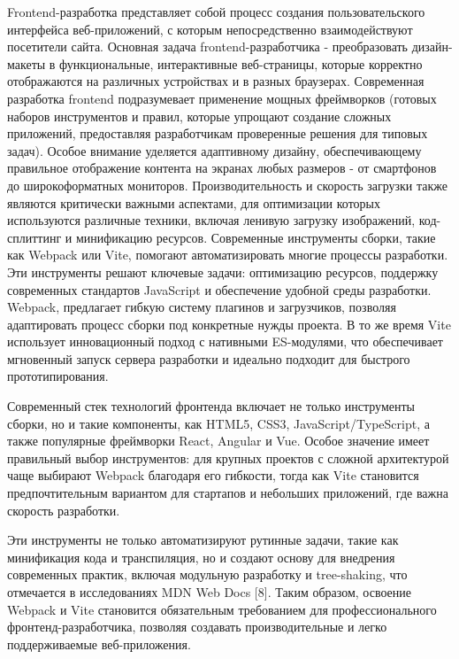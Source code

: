\documentclass[referat]{SCWorks}
\begin{document}
Frontend-разработка представляет собой процесс создания пользовательского интерфейса веб-приложений, с которым непосредственно взаимодействуют посетители сайта. Основная задача frontend-разработчика - преобразовать дизайн-макеты в функциональные, интерактивные веб-страницы, которые корректно отображаются на различных устройствах и в разных браузерах. Современная разработка frontend подразумевает применение мощных фреймворков (готовых наборов инструментов и правил, которые упрощают создание сложных приложений, предоставляя разработчикам проверенные решения для типовых задач). Особое внимание уделяется адаптивному дизайну, обеспечивающему правильное отображение контента на экранах любых размеров - от смартфонов до широкоформатных мониторов. Производительность и скорость загрузки также являются критически важными аспектами, для оптимизации которых используются различные техники, включая ленивую загрузку изображений, код-сплиттинг и минификацию ресурсов. Современные инструменты сборки, такие как Webpack или Vite, помогают автоматизировать многие процессы разработки.\cite{frontend_web_development} Эти инструменты решают ключевые задачи: оптимизацию ресурсов, поддержку современных стандартов JavaScript и обеспечение удобной среды разработки. Webpack, предлагает гибкую систему плагинов и загрузчиков, позволяя адаптировать процесс сборки под конкретные нужды проекта. В то же время Vite использует инновационный подход с нативными ES-модулями, что обеспечивает мгновенный запуск сервера разработки и идеально подходит для быстрого прототипирования.\cite{mdn_web_docs}

Современный стек технологий фронтенда включает не только инструменты сборки, но и такие компоненты, как HTML5, CSS3, JavaScript/TypeScript, а также популярные фреймворки React, Angular и Vue. Особое значение имеет правильный выбор инструментов: для крупных проектов с сложной архитектурой чаще выбирают Webpack благодаря его гибкости, тогда как Vite становится предпочтительным вариантом для стартапов и небольших приложений, где важна скорость разработки.\cite{web_dev_2024}

Эти инструменты не только автоматизируют рутинные задачи, такие как минификация кода и транспиляция, но и создают основу для внедрения современных практик, включая модульную разработку и tree-shaking, что отмечается в исследованиях MDN Web Docs [8]. Таким образом, освоение Webpack и Vite становится обязательным требованием для профессионального фронтенд-разработчика, позволяя создавать производительные и легко поддерживаемые веб-приложения.
\end{document}
